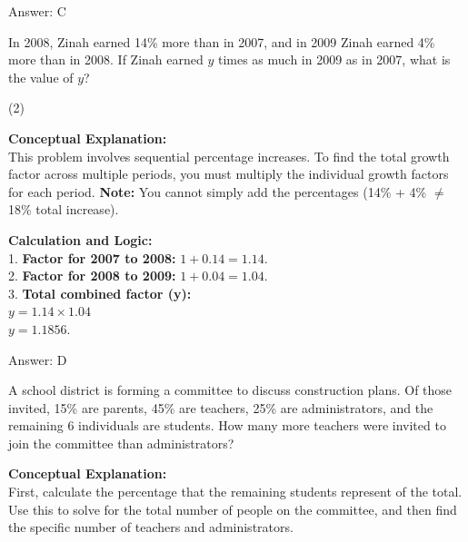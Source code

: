 \documentclass[11pt,paper=a4,answers]{exam}
\begin{document}
\begin{questions}
\begin{solution}
\vspace{30pt}

Answer: \colorbox{yellow!100}{C}
\end{solution}

\vspace{60pt}

\question
In 2008, Zinah earned 14\% more than in 2007, and in 2009 Zinah earned 4\% more than in 2008. If Zinah earned $y$ times as much in 2009 as in 2007, what is the value of $y$?
\begin{tasks}(2)
\end{tasks}

\begin{solution}
\textbf{Conceptual Explanation:} \\
This problem involves sequential percentage increases. To find the total growth factor across multiple periods, you must multiply the individual growth factors for each period. \textbf{Note:} You cannot simply add the percentages (14\% + 4\% $\neq$ 18\% total increase).

\vspace{30pt}

\textbf{Calculation and Logic:} \\
1. \textbf{Factor for 2007 to 2008:} $1 + 0.14 = 1.14$. \\
2. \textbf{Factor for 2008 to 2009:} $1 + 0.04 = 1.04$. \\
3. \textbf{Total combined factor (y):} \\
   $y = 1.14 \times 1.04$ \\
   $y = 1.1856$.

\vspace{30pt}

Answer: \colorbox{yellow!100}{D}
\end{solution}

\vspace{60pt}

\question
A school district is forming a committee to discuss construction plans. Of those invited, 15\% are parents, 45\% are teachers, 25\% are administrators, and the remaining 6 individuals are students. How many more teachers were invited to join the committee than administrators?

\begin{solution}
\textbf{Conceptual Explanation:} \\
First, calculate the percentage that the remaining students represent of the total. Use this to solve for the total number of people on the committee, and then find the specific number of teachers and administrators.


\end{solution}
\end{questions}
\end{document}
